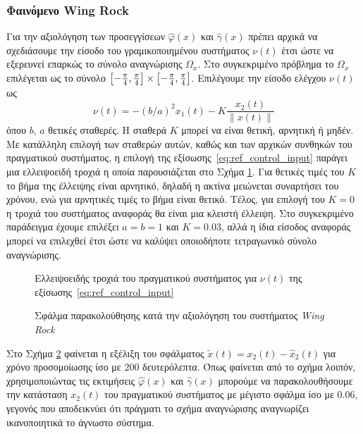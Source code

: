\subsubsection{Φαινόμενο Wing Rock}
Για την αξιολόγηση των προσεγγίσεων $\hat{\varphi}(x)$ και $\hat{\gamma}(x)$ πρέπει αρχικά να σχεδιάσουμε την είσοδο του γραμικοποιημένου συστήματος $\nu(t)$ έτσι ώστε να εξερευνεί επαρκώς το σύνολο αναγνώρισης $\Omega_x$. Στο συγκεκριμένο πρόβλημα το $\Omega_x$ επιλέγεται ως το σύνολο $\bmqty{-\frac{\pi}{4},\frac{\pi}{4}} \times \bmqty{-\frac{\pi}{4},\frac{\pi}{4}}$. Επιλέγουμε την είσοδο ελέγχου $\nu(t)$ ως 
\begin{equation}
\nu(t) = -(b/a)^2 x_1(t) - K \frac{x_2(t)}{\| x(t) \|}
\label{eq:ref_control_input}
\end{equation}
όπου $b$, $a$ θετικές σταθερές. Η σταθερά $K$ μπορεί να είναι θετική, αρνητική ή μηδέν. Με κατάλληλη επιλογή των σταθερών αυτών, καθώς και των αρχικών συνθηκών του πραγματικού συστήματος, η επιλογή της εξίσωσης~\eqref{eq:ref_control_input} παράγει μια ελλειψοειδή τροχιά η οποία παρουσιάζεται στο Σχήμα \ref{fig:ellipse_traj}. Για θετικές τιμές του $K$ το βήμα της έλλειψης είναι αρνητικό, δηλαδή η ακτίνα μειώνεται συναρτήσει του χρόνου, ενώ για αρνητικές τιμές το βήμα είναι θετικό. Τέλος, για επιλογή του $K = 0$ η τροχιά του συστήματος αναφοράς θα είναι μια κλειστή έλλειψη. Στο συγκεκριμένο παράδειγμα έχουμε επιλέξει $a = b = 1$ και $Κ = 0.03$, αλλά η ίδια είσοδος αναφοράς μπορεί να επιλεχθεί έτσι ώστε να καλύψει οποιοδήποτε τετραγωνικό σύνολο αναγνώρισης.

\begin{figure}
	\centering
	
	\caption{Ελλειψοειδής τροχιά του πραγματικού συστήματος για $\nu(t)$ της εξίσωσης~\eqref{eq:ref_control_input} }
	\label{fig:ellipse_traj}
\end{figure}

\begin{figure}
	\centering
	
	\caption{Σφάλμα παρακολούθησης κατά την αξιολόγηση του συστήματος \textit{Wing Rock} }
	\label{fig:wing_rock_eval_error} 
\end{figure}

Στο Σχήμα \ref{fig:wing_rock_eval_error} φαίνεται η εξέλιξη του σφάλματος $\tilde{x}(t) = x_2(t) - \hat{x}_2(t)$ για χρόνο προσομοίωσης ίσο με 200 δευτερόλεπτα. Όπως φαίνεται από το σχήμα λοιπόν, χρησιμοποιώντας τις εκτιμήσεις $\hat{\varphi}(x)$ και $\hat{\gamma}(x)$ μπορούμε να παρακολουθήσουμε την κατάσταση $x_2(t)$ του πραγματικού συστήματος με μέγιστο σφάλμα ίσο με 0.06, γεγονός που αποδεικνύει ότι πράγματι το σχήμα αναγνώρισης αναγνωρίζει ικανοποιητικά το άγνωστο σύστημα.

